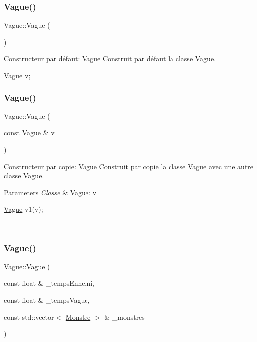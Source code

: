 \subsubsection{\texorpdfstring{Vague()}{Vague()}\hspace{0.1cm}{\footnotesize\ttfamily [1/3]}}
{\footnotesize\ttfamily Vague\+::\+Vague (\begin{DoxyParamCaption}{ }\end{DoxyParamCaption})}



Constructeur par défaut\+: \hyperlink{classVague}{Vague} Construit par défaut la classe \hyperlink{classVague}{Vague}. 


\begin{DoxyCode}
\hyperlink{classVague}{Vague} v;
\end{DoxyCode}
 \mbox{\label{classVague_aa1c2e536319c3b66880a5d7dd7cbb444}} 
\subsubsection{\texorpdfstring{Vague()}{Vague()}\hspace{0.1cm}{\footnotesize\ttfamily [2/3]}}
{\footnotesize\ttfamily Vague\+::\+Vague (\begin{DoxyParamCaption}\item[{const \hyperlink{classVague}{Vague} \&}]{v }\end{DoxyParamCaption})}



Constructeur par copie\+: \hyperlink{classVague}{Vague} Construit par copie la classe \hyperlink{classVague}{Vague} avec une autre classe \hyperlink{classVague}{Vague}. 


\begin{DoxyParams}{Parameters}
{\em Classe} & \hyperlink{classVague}{Vague}\+: v 
\begin{DoxyCode}
\hyperlink{classVague}{Vague} v1(v);
\end{DoxyCode}
 \\
\hline
\end{DoxyParams}
\mbox{\label{classVague_a676fd5a235236ec1bb0b9b6a974c3296}} 
\subsubsection{\texorpdfstring{Vague()}{Vague()}\hspace{0.1cm}{\footnotesize\ttfamily [3/3]}}
{\footnotesize\ttfamily Vague\+::\+Vague (\begin{DoxyParamCaption}\item[{const float \&}]{\+\_\+temps\+Ennemi,  }\item[{const float \&}]{\+\_\+temps\+Vague,  }\item[{const std\+::vector$<$ \hyperlink{classMonstre}{Monstre} $>$ \&}]{\+\_\+monstres }\end{DoxyParamCaption})}



